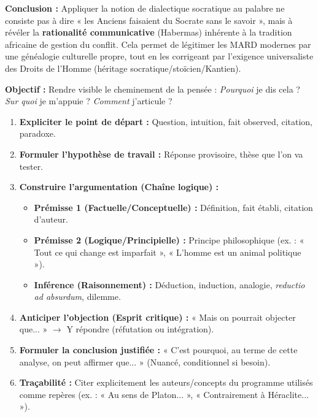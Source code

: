\documentclass[11pt]{article}
\newcommand{\cle}[1]{{\popxbold\color{popdark}#1}}
\begin{document}
\begin{exoresolu}
\textbf{Conclusion :} Appliquer la notion de dialectique socratique au palabre ne consiste pas à dire « les Anciens faisaient du Socrate sans le savoir », mais à révéler la \textbf{rationalité communicative} (Habermas) inhérente à la tradition africaine de gestion du conflit. Cela permet de légitimer les MARD modernes par une généalogie culturelle propre, tout en les corrigeant par l'exigence universaliste des Droits de l'Homme (héritage socratique/stoïcien/Kantien).
\end{exoresolu}

\begin{methode}
\textbf{Objectif :} Rendre visible le cheminement de la pensée : \emph{Pourquoi} je dis cela ? \emph{Sur quoi} je m'appuie ? \emph{Comment} j'articule ?
\begin{enumerate}
    \item \textbf{Expliciter le point de départ :} Question, intuition, fait observed, citation, paradoxe.
    \item \textbf{Formuler l'hypothèse de travail :} Réponse provisoire, thèse que l'on va tester.
    \item \textbf{Construire l'argumentation (Chaîne logique) :}
        \begin{itemize}
            \item \textbf{Prémisse 1 (Factuelle/Conceptuelle) :} Définition, fait établi, citation d'auteur.
            \item \textbf{Prémisse 2 (Logique/Principielle) :} Principe philosophique (ex. : « Tout ce qui change est imparfait », « L'homme est un animal politique »).
            \item \textbf{Inférence (Raisonnement) :} Déduction, induction, analogie, \emph{reductio ad absurdum}, dilemme.
        \end{itemize}
    \item \textbf{Anticiper l'objection (Esprit critique) :} « Mais on pourrait objecter que... » $\rightarrow$ Y répondre (réfutation ou intégration).
    \item \textbf{Formuler la conclusion justifiée :} « C'est pourquoi, au terme de cette analyse, on peut affirmer que... » (Nuancé, conditionnel si besoin).
    \item \textbf{Traçabilité :} Citer explicitement les auteurs/concepts du programme utilisés comme \cle{repères} (ex. : « Au sens de Platon... », « Contrairement à Héraclite... »).
\end{enumerate}
\end{methode}
\end{document}

